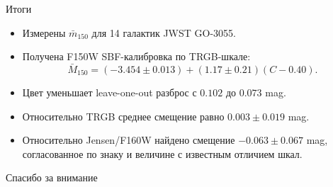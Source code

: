 \documentclass[aspectratio=169, 11pt]{beamer}
\begin{document}
\begin{frame}{Итоги}
    \begin{itemize}
        \item Измерены $\bar{m}_{150}$ для 14 галактик JWST GO-3055.
        \item Получена F150W SBF-калибровка по TRGB-шкале:
        \begin{equation*}
            \bar{M}_{150}=(-3.454\pm0.013)+(1.17\pm0.21)(C-0.40).
        \end{equation*}
        \item Цвет уменьшает leave-one-out разброс с $0.102$ до $0.073$ mag.
        \item Относительно TRGB среднее смещение равно $0.003\pm0.019$ mag.
        \item Относительно Jensen/F160W найдено смещение $-0.063\pm0.067$ mag, согласованное по знаку и величине с известным отличием шкал.
    \end{itemize}
\end{frame}

\begin{frame}
    \centering
    \vspace{1.5cm}
    {\Huge Спасибо за внимание}
\end{frame}
\end{document}
